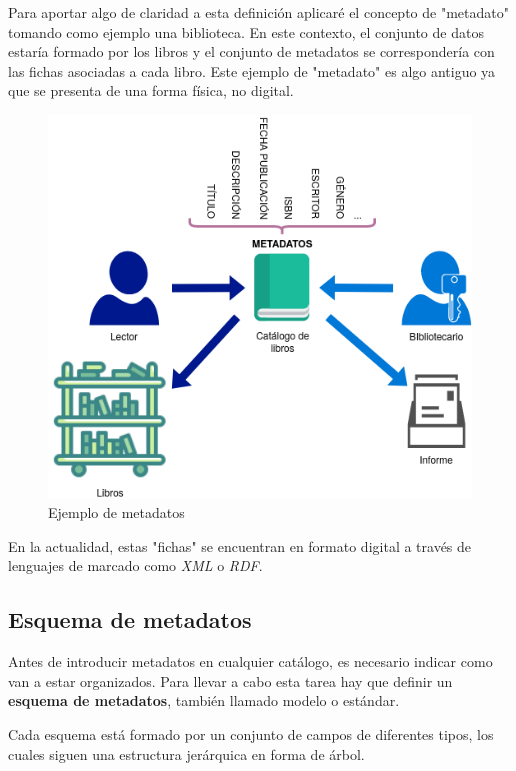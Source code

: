 \documentclass[
]{article}
\begin{document}
Para aportar algo de claridad a esta definición aplicaré el concepto de
"metadato" tomando como ejemplo una biblioteca. En este contexto, el
conjunto de datos estaría formado por los libros y el conjunto de
metadatos se correspondería con las fichas asociadas a cada libro. Este
ejemplo de "metadato" es algo antiguo ya que se presenta de una forma
física, no digital.

\begin{figure}
\hypertarget{ejemploMetadatos}{%
\centering
\includegraphics{../_static/images/ejemploMetadatos.png}
\caption{Ejemplo de metadatos}\label{ejemploMetadatos}
}
\end{figure}

En la actualidad, estas "fichas" se encuentran en formato digital a
través de lenguajes de marcado como \emph{XML} o \emph{RDF}.

\hypertarget{esquema-de-metadatos}{%
\subsection{Esquema de metadatos}\label{esquema-de-metadatos}}

Antes de introducir metadatos en cualquier catálogo, es necesario
indicar como van a estar organizados. Para llevar a cabo esta tarea hay
que definir un \textbf{esquema de metadatos}, también llamado modelo o
estándar.

Cada esquema está formado por un conjunto de campos de diferentes tipos,
los cuales siguen una estructura jerárquica en forma de árbol.
\end{document}
